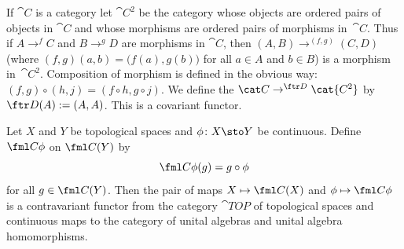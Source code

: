 \begin{exam}\label{0007606} If $\cat C$ is a category let
$\cat{C^2}$ be the category whose objects are ordered pairs of objects in $\cat C$ and
whose morphisms are ordered pairs of morphisms in~$\cat C$.  Thus if $A \to^f C$ and $B
\to^g D$ are morphisms in $\cat C$, then $(A,B) \to^{(f,g)} (C,D)$ (where $(f,g)(a,b) =
\bigl(f(a),g(b)\bigr)$ for all $a \in A$ and $b \in B$) is a morphism in~$\cat{C^2}$.
Composition of morphism is defined in the obvious way: $(f,g) \circ (h,j) = (f \circ h, g
\circ j)$. We define the
 $\cat C \to^{\ftr D} \cat{C^2}$ by $\ftr D(A) := (A,A)$. This is a
covariant functor.
\end{exam}

\begin{exam}\label{C029717} Let $X$ and $Y$ be topological spaces and $\phi\colon X \sto Y$
be continuous. Define $\fml C \phi$ on $\fml C(Y)$ by
    \[ \fml C \phi(g) = g \circ \phi \]
for all $g \in \fml C(Y)$.  Then the pair of maps $X \mapsto \fml C(X)$ and
$\phi \mapsto \fml C \phi$ is a contravariant functor from the category $\cat{TOP}$ of topological
spaces and continuous maps to the category of unital algebras and unital algebra
homomorphisms.
\end{exam}













\endinput

